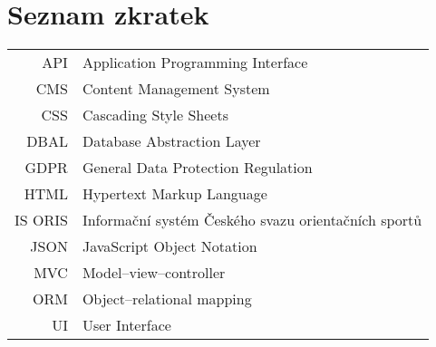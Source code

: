 \documentclass[czech,bachelor,unicode]{ctufit-thesis}
\theoremstyle{plain}
\theoremstyle{definition}
\theoremstyle{remark}
\numberwithin{theorem}{chapter}
\begin{document}
% 
% 
% 
% 
% 
% 
% 
% 
% 

\chapter{Seznam zkratek}
	
\begin{tabular}{rl}
API & Application Programming Interface\\
CMS & Content Management System\\
CSS & Cascading Style Sheets\\
DBAL & Database Abstraction Layer\\
GDPR & General Data Protection Regulation\\
HTML & Hypertext Markup Language\\
IS ORIS & Informační systém Českého svazu orientačních sportů\\
JSON & JavaScript Object Notation\\
MVC & Model–view–controller\\
ORM & Object–relational mapping\\
UI & User Interface
\end{tabular}
\end{document}
